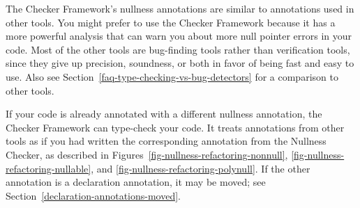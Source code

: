 The Checker Framework's nullness annotations are similar to annotations used
in other
tools.
You might prefer to use the Checker Framework because it has a more
powerful analysis that can warn you about more null pointer errors in your
code.
Most of the other tools are bug-finding tools rather than verification tools, since they
give up precision, soundness, or both in favor of being fast and
easy to use.  Also
see Section~\ref{faq-type-checking-vs-bug-detectors} for a comparison to other tools.

If your code is already annotated with a different nullness
annotation, the Checker Framework can type-check your code.
It treats annotations from other tools
as if you had written the corresponding annotation from the
Nullness Checker, as described in Figures~\ref{fig-nullness-refactoring-nonnull},
\ref{fig-nullness-refactoring-nullable}, and
\ref{fig-nullness-refactoring-polynull}.
If the other annotation is a declaration annotation, it may be moved; see
Section~\ref{declaration-annotations-moved}.



